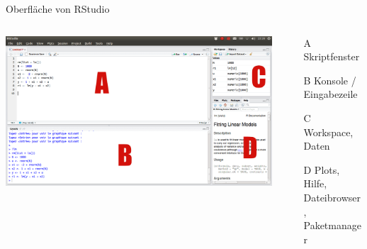 \documentclass[aspectratio = 169]{chariteBeamer}
\begin{document}
\begin{frame}{Oberfläche von RStudio}
\begin{columns}[T]
	\begin{column}{0.6\textwidth}
	\includegraphics[scale=0.65]{Rstudio_interface1}
	\end{column}
	\begin{column}{0.4\textwidth}
	\begin{enumerate}
		\item[A] Skriptfenster
		\item[B] Konsole / Eingabezeile
		\item[C] Workspace, Daten
		\item[D] Plots, Hilfe, Dateibrowser, Paketmanager
	\end{enumerate}
	\end{column}
\end{columns}
\end{frame}
\end{document}

